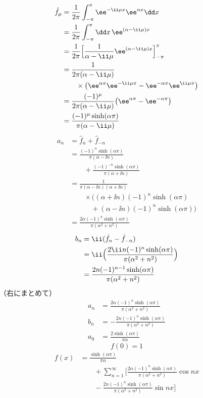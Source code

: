 \begin{align*}
  \hat{f}_{\mu}&=\frac{1}{2\pi}\int_{-\pi}^{\pi}\ee^{-\ii\mu x}\ee^{\alpha x}\dd x\\
  &=\frac{1}{2\pi}\int_{-\pi}^{\pi}\dd x\,\ee^{(\alpha-\ii\mu)x}\\
  &=\frac{1}{2\pi}\Bigl[\frac{1}{\alpha-\ii\mu}\ee^{(\alpha-\ii\mu)x}\Bigr]_{-\pi}^{\pi}\\
  &=\frac{1}{2\pi(\alpha-\ii\mu)}\\
  &\qquad\times\bigl(\ee^{\alpha\pi}\ee^{-\ii\mu\pi}-\ee^{-\alpha\pi}\ee^{\ii\mu\pi}\bigr)\\
  &=\frac{(-1)^{\mu}}{2\pi(\alpha-\ii\mu)}\bigl(\ee^{\alpha\pi}-\ee^{-\alpha\pi}\bigr)\\
  &=\frac{(-1)^{\mu}\sinh(\alpha\pi)}{\pi(\alpha-\ii\mu)}
\end{align*}
\begin{align*}
  a_n&=\hat{f}_n+\hat{f}_{-n}\\
  &=\frac{(-1)^{n}\sinh(\alpha\pi)}{\pi(\alpha-\ii n)}\\
  &\qquad+\frac{(-1)^{-n}\sinh(\alpha\pi)}{\pi(\alpha+\ii n)}\\
  &=\frac{1}{\pi(\alpha-\ii n)(\alpha+\ii n)}\\
  &\qquad\times\bigl((\alpha+\ii n)(-1)^{n}\sinh(\alpha\pi)\\
  &\qquad\quad+(\alpha-\ii n)(-1)^{n}\sinh(\alpha\pi)\bigr)\\
  &=\frac{2\alpha(-1)^{n}\sinh(\alpha\pi)}{\pi(\alpha^{2}+n^{2})}
\end{align*}
\begin{align*}
  b_n&=\ii(\hat{f}_n-\hat{f}_{-n})\\
  &=\ii\Bigl(\frac{2\ii n(-1)^{n}\sinh(\alpha\pi)}{\pi(\alpha^{2}+n^{2})}\Bigr)\\
  &=\frac{2n(-1)^{n-1}\sinh(\alpha\pi)}{\pi(\alpha^{2}+n^{2})}
\end{align*}
（右にまとめて）
\begin{align*}
  a_n&=\frac{2\alpha(-1)^{n}\sinh(\alpha\pi)}{\pi(\alpha^{2}+n^{2})}\\
  b_n&=-\frac{2n(-1)^{n}\sinh(\alpha\pi)}{\pi(\alpha^{2}+n^{2})}\\
  a_0&=\frac{2\sinh(\alpha\pi)}{\pi\alpha}
\end{align*}
\[ f(0)=1 \]
\begin{align*}
  f(x)&=\frac{\sinh(\alpha\pi)}{\pi\alpha}\\
  &\qquad+\sum_{n=1}^{\infty}\biggl[\frac{2\alpha(-1)^{n}\sinh(\alpha\pi)}{\pi(\alpha^{2}+n^{2})}\cos nx\\
  &\qquad-\frac{2n(-1)^{n}\sinh(\alpha\pi)}{\pi(\alpha^{2}+n^{2})}\sin nx\biggr]
\end{align*}
